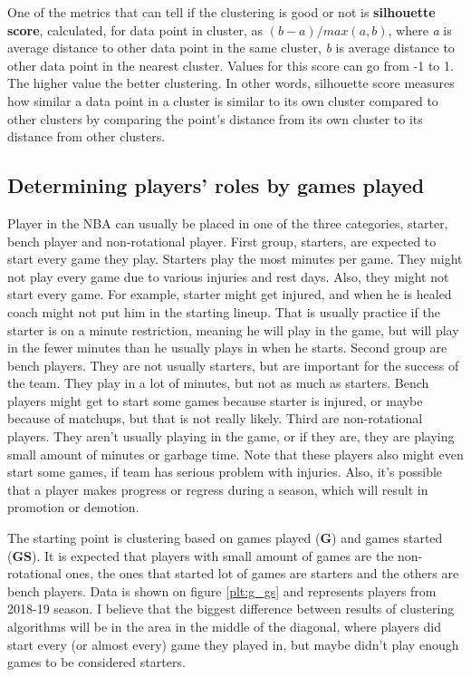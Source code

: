 \documentclass[a4paper]{article}
\begin{document}
One of the metrics that can tell if the clustering is good or not is \textbf{silhouette score}, calculated, for data point in cluster, as $ (b - a)  / max(a, b) $, where \textit{a} is average distance to other data point in the same cluster, \textit{b} is average distance to other data point in the nearest cluster. Values for this score can go from -1 to 1. The higher value the better clustering. In other words, silhouette score measures how similar a data point in a cluster is similar to its own cluster compared to other clusters by comparing the point’s distance from its own cluster to its distance from other clusters. \cite{clustering}

\subsection{Determining players' roles by games played}
\label{subsec:players_roles}

Player in the NBA can usually be placed in one of the three categories, starter, bench player and non-rotational player. First group, starters, are expected to start every game they play. Starters play the most minutes per game. They might not play every game due to various injuries and rest days. Also, they might not start every game. For example, starter might get injured, and when he is healed coach might not put him in the starting lineup. That is usually practice if the starter is on a minute restriction, meaning he will play in the game, but will play in the fewer minutes than he usually plays in when he starts. Second group are bench players. They are not usually starters, but are important for the success of the team. They play in a lot of minutes, but not as much as starters. Bench players might get to start some games because starter is injured, or maybe because of matchups, but that is not really likely. Third are non-rotational players. They aren't usually playing in the game, or if they are, they are playing small amount of minutes or garbage time. Note that these players also might even start some games, if team has serious problem with injuries. Also, it's possible that a player makes progress or regress during a season, which will result in promotion or demotion.

The starting point is clustering based on games played (\textbf{G}) and games started (\textbf{GS}). It is expected that players with small amount of games are the non-rotational ones, the ones that started lot of games are starters and the others are bench players. Data is shown on figure \ref{plt:g_gs} and represents players from 2018-19 season. I believe that the biggest difference between results of clustering algorithms will be in the area in the middle of the diagonal, where players did start every (or almost every) game they played in, but maybe didn't play enough games to be considered starters.
\end{document}
